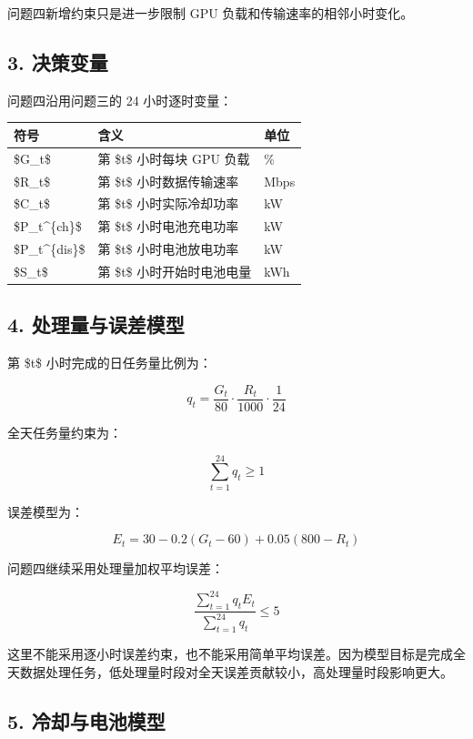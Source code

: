 \documentclass[
]{article}
\begin{document}
问题四新增约束只是进一步限制 GPU 负载和传输速率的相邻小时变化。

\subsection{3. 决策变量}\label{3-ux51b3ux7b56ux53d8ux91cf}

问题四沿用问题三的 24 小时逐时变量：

\begin{longtable}[]{@{}lll@{}}
\toprule\noalign{}
符号 & 含义 & 单位 \\
\midrule\noalign{}
\endhead
\bottomrule\noalign{}
\endlastfoot
\$G\_t\$ & 第 \$t\$ 小时每块 GPU 负载 & \% \\
\$R\_t\$ & 第 \$t\$ 小时数据传输速率 & Mbps \\
\$C\_t\$ & 第 \$t\$ 小时实际冷却功率 & kW \\
\$P\_t\^{}\{ch\}\$ & 第 \$t\$ 小时电池充电功率 & kW \\
\$P\_t\^{}\{dis\}\$ & 第 \$t\$ 小时电池放电功率 & kW \\
\$S\_t\$ & 第 \$t\$ 小时开始时电池电量 & kWh \\
\end{longtable}

\subsection{4.
处理量与误差模型}\label{4-ux5904ux7406ux91cfux4e0eux8befux5deeux6a21ux578b}

第 \$t\$ 小时完成的日任务量比例为：

\[q_t=\frac{G_t}{80}\cdot\frac{R_t}{1000}\cdot\frac{1}{24}\]

全天任务量约束为：

\[\sum_{t=1}^{24}q_t\ge 1\]

误差模型为：

\[E_t=30-0.2(G_t-60)+0.05(800-R_t)\]

问题四继续采用处理量加权平均误差：

\[\frac{\sum_{t=1}^{24}q_tE_t}{\sum_{t=1}^{24}q_t}\le 5\]

这里不能采用逐小时误差约束，也不能采用简单平均误差。因为模型目标是完成全天数据处理任务，低处理量时段对全天误差贡献较小，高处理量时段影响更大。

\subsection{5.
冷却与电池模型}\label{5-ux51b7ux5374ux4e0eux7535ux6c60ux6a21ux578b}
\end{document}
